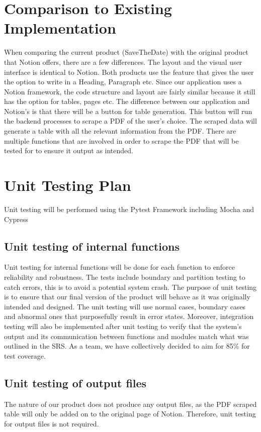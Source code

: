 \documentclass[12pt, titlepage]{article}
\begin{document}
	
\section{Comparison to Existing Implementation}

When comparing the current product (SaveTheDate) with the original product that Notion offers, there are a few differences. The layout and the visual user interface is identical to Notion. Both products use the feature that gives the user the option to write in a Heading, Paragraph etc. Since our application uses a Notion framework, the code structure and layout are fairly similar because it still has the option for tables, pages etc. The difference between our application and Notion’s is that there will be a button for table generation. This button will run the backend processes to scrape a PDF of the user’s choice. The scraped data will generate a table with all the relevant information from the PDF. There are multiple functions that are involved in order to scrape the PDF that will be tested for to ensure it output as intended. 
				
\section{Unit Testing Plan}

Unit testing will be performed using the Pytest Framework including Mocha and Cypress
		
\subsection{Unit testing of internal functions}
Unit testing for internal functions will be done for each function to enforce reliability and robustness. The tests include boundary and partition testing to catch errors, this is to avoid a potential system crash.  The purpose of unit testing is to ensure that our final version of the product will behave as it was originally intended and designed. The unit testing will use normal cases, boundary cases and abnormal ones that purposefully result in error states. Moreover, integration testing will also be implemented after unit testing to verify that the system’s output and its communication between functions and modules match what was outlined in the SRS. As a team, we have collectively decided to aim for 85\% for test coverage. 

\subsection{Unit testing of output files}	
The nature of our product does not produce any output files, as the PDF scraped table will only be added on to the original page of Notion. Therefore, unit testing for output files is not required. 	
\end{document}
